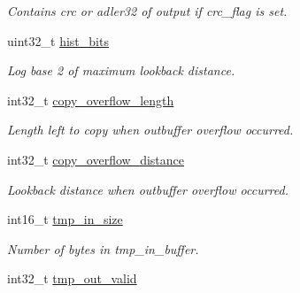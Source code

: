 \begin{DoxyCompactItemize}
\begin{DoxyCompactList}\small\item\em Contains crc or adler32 of output if crc\-\_\-flag is set. \end{DoxyCompactList}\item 
\hypertarget{structinflate__state_a38879a59194da05b16beb16ac1753843}{uint32\-\_\-t \hyperlink{structinflate__state_a38879a59194da05b16beb16ac1753843}{hist\-\_\-bits}}\label{structinflate__state_a38879a59194da05b16beb16ac1753843}

\begin{DoxyCompactList}\small\item\em Log base 2 of maximum lookback distance. \end{DoxyCompactList}\item 
\hypertarget{structinflate__state_a69940c6f7c20c4817dc395217d052594}{int32\-\_\-t \hyperlink{structinflate__state_a69940c6f7c20c4817dc395217d052594}{copy\-\_\-overflow\-\_\-length}}\label{structinflate__state_a69940c6f7c20c4817dc395217d052594}

\begin{DoxyCompactList}\small\item\em Length left to copy when outbuffer overflow occurred. \end{DoxyCompactList}\item 
\hypertarget{structinflate__state_a9eb789eea7581efad31ebd10fc09cbc6}{int32\-\_\-t \hyperlink{structinflate__state_a9eb789eea7581efad31ebd10fc09cbc6}{copy\-\_\-overflow\-\_\-distance}}\label{structinflate__state_a9eb789eea7581efad31ebd10fc09cbc6}

\begin{DoxyCompactList}\small\item\em Lookback distance when outbuffer overflow occurred. \end{DoxyCompactList}\item 
\hypertarget{structinflate__state_ab6a6c36c9bda624f3b15f380f6dfd563}{int16\-\_\-t \hyperlink{structinflate__state_ab6a6c36c9bda624f3b15f380f6dfd563}{tmp\-\_\-in\-\_\-size}}\label{structinflate__state_ab6a6c36c9bda624f3b15f380f6dfd563}

\begin{DoxyCompactList}\small\item\em Number of bytes in tmp\-\_\-in\-\_\-buffer. \end{DoxyCompactList}\item 
\hypertarget{structinflate__state_ad7a6734e5267eac4769b125cc3c3edb4}{int32\-\_\-t \hyperlink{structinflate__state_ad7a6734e5267eac4769b125cc3c3edb4}{tmp\-\_\-out\-\_\-valid}}\label{structinflate__state_ad7a6734e5267eac4769b125cc3c3edb4}


\end{DoxyCompactItemize}
